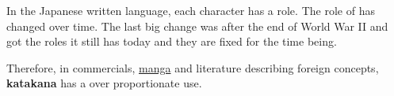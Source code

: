 
\label{sec:role}

In the Japanese written language, each character has a role. The role of
\textbf{\jtopic} has changed over time. The last big change was after the end
of World War II and \textbf{\jtopic} got the roles it still has today and they
are fixed for the time being.

\bigskip



\medskip


Therefore, in commercials, \hyperref[sec:Manga]{manga} and literature
describing foreign concepts, \textbf{katakana} has a over proportionate use.

%

%


